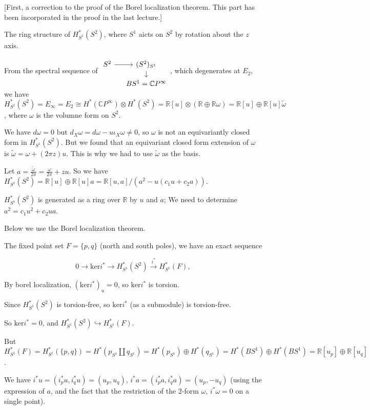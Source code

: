 \documentclass{article}
\theoremstyle{mystyle}
\theoremstyle{remark}
\numberwithin{equation}{section}
\begin{document}
[First, a correction to the proof of the Borel localization theorem. This part has been incorporated in the proof in the last lecture.]


The ring structure of $H^*_{S^1}(S^2)$, where $S^1$ aicts on $S^2$ by rotation about the $z$ axis.

From the spectral sequence of $\begin{tikzcd}[column sep = small, row sep = small] S^2 \ar[r] & (S^2)_{S^1} \ar[d] \\ & BS^1 = \mathbb{C}P^\infty \end{tikzcd}$, which degenerates at $E_2$, we have $H^*_{S^1}(S^2)  = E_\infty = E_2 \cong H^*(\mathbb{C}P^\infty)\otimes H^*(S^2)
=\mathbb{R}[u]\otimes (\mathbb{R}\oplus \mathbb{R}\omega) = \mathbb{R}[u]\oplus \mathbb{R}[u]\widetilde{\omega}$, where $\omega$ is the volumne form on $S^2$.  

We have $d\omega=0$ but $d_X\omega = d\omega -u\iota_X\omega \neq 0$, so $\omega$ is not an equivariantly closed form in $H^*_{S^1}(S^2)$. But we found that an equivariant closed form extension of $\omega$ is $\widetilde{\omega} = \omega + (2\pi z)u$. This is why we had to use $\widetilde{\omega}$ as the basis. 

Let $a = \frac{\widetilde{\omega}}{2\pi} = \frac{\omega}{2\pi} + zu$.  So we have 
$H^*_{S^1}(S^2)  = \mathbb{R}[u] \oplus \mathbb{R}[u]a = \mathbb{R}[u,a]/(a^2 -u( c_1 u+c_2 a))$. 

$H^*_{S^1}(S^2)$ is generated as a ring over $\mathbb{R}$ by $u$ and $a$; We need to determine $a^2 = c_1u^2 + c_2 ua$. 

Below we use the Borel localization theorem.

The fixed point set $F = \{p,q\}$ (north and south poles), we have an exact sequence

$$0\rightarrow \mathrm{ker}i^* \rightarrow H^*_{S^1}(S^2) \xrightarrow{i^*}H^*_{S^1}(F),$$

By borel localization, $(\mathrm{ker}i^*)_u=0$, so $\mathrm{ker}i^*$ is torsion.

Since $H^*_{S^1}(S^2)$ is torsion-free, so $\mathrm{ker}i^*$ (as a submodule) is torsion-free. 

So $\mathrm{ker}i^*=0$, and $H^*_{S^1}(S^2) \hookrightarrow H^*_{S^1}(F)$.

But $H^*_{S^1}(F) = H^*_{S^1}(\{p,q\}) = H^*(p_{S^1}\amalg q_{S^1}) = H^*(p_{S^1})\oplus H^*(q_{S^1})= H^*(BS^1)\oplus H^*(BS^1) = \mathbb{R}[u_p]\oplus \mathbb{R}[u_q]$.

We have $i^*u = (i^*_pu , i^*_qu)=(u_p,u_q)$, $i^*a = (i_p^*a,i_q^*a) = (u_p,-u_q)$ (using the expression of $a$, and the fact that the restriction of the 2-form $\omega$, $i^*\omega=0$ on a single point).
\end{document}

